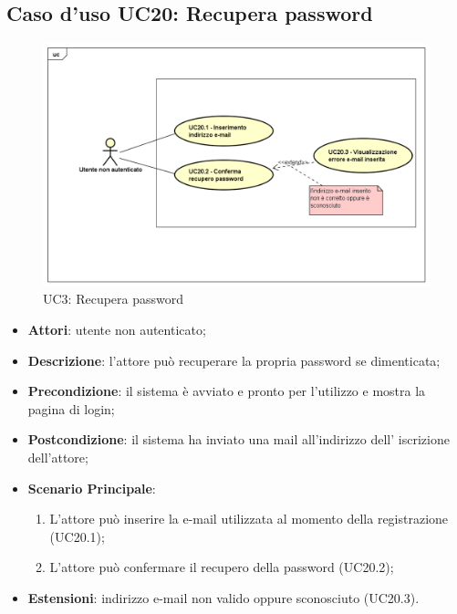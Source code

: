 \newpage
\subsection{Caso d'uso UC20: Recupera password}
\label{UC20}
\begin{figure}
	\centering
	\includegraphics[scale=0.48]{UML/UC20.png}
	\caption{UC3: Recupera password}
\end{figure}
\FloatBarrier
\begin{itemize}
	\item \textbf{Attori}: utente non autenticato;
	\item \textbf{Descrizione}: l'attore può recuperare la propria password se dimenticata;
	\item \textbf{Precondizione}: il sistema è avviato e pronto per l'utilizzo e mostra la pagina di login;
	\item \textbf{Postcondizione}: il sistema ha inviato una mail all'indirizzo dell' iscrizione dell'attore;
	\item \textbf{Scenario Principale}:
	\begin{enumerate}
		\item L'attore può inserire la e-mail utilizzata al momento della registrazione (UC20.1);
		\item L'attore può confermare il recupero della password (UC20.2);
	\end{enumerate}
	\item \textbf{Estensioni}: indirizzo e-mail non valido oppure sconosciuto (UC20.3).
\end{itemize}

